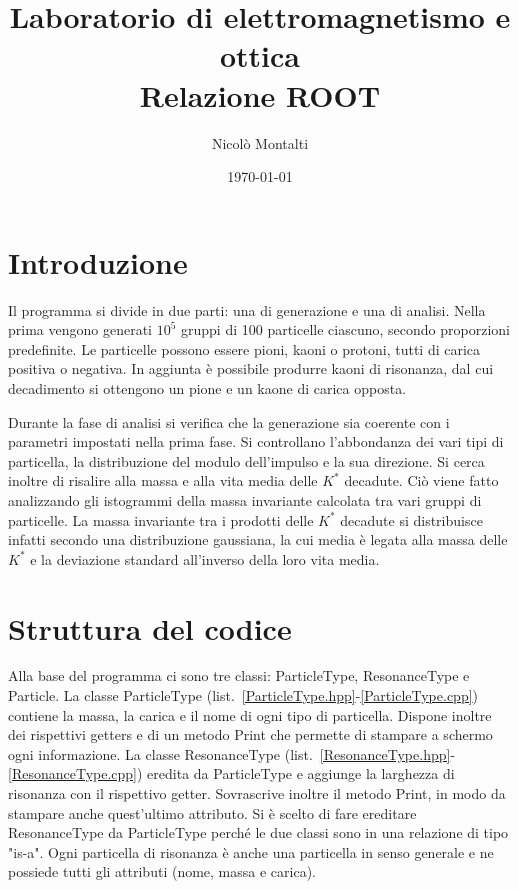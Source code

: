 \documentclass[a4paper,10pt]{article}
\title{Laboratorio di elettromagnetismo e ottica\\Relazione ROOT}
\author{Nicolò Montalti}
\date{\today}
\begin{document}
\maketitle
\section{Introduzione}
Il programma si divide in due parti: una di generazione e una di analisi. Nella prima vengono generati $10^5$ gruppi di 100 particelle ciascuno, secondo proporzioni predefinite. Le particelle possono essere pioni, kaoni o protoni, tutti di carica positiva o negativa. In aggiunta è possibile produrre kaoni di risonanza, dal cui decadimento si ottengono un pione e un kaone di carica opposta.

Durante la fase di analisi si verifica che la generazione sia coerente con i parametri impostati nella prima fase. Si controllano l'abbondanza dei vari tipi di particella, la distribuzione del modulo dell'impulso e la sua direzione. Si cerca inoltre di risalire alla massa e alla vita media delle $K^*$ decadute. Ciò viene fatto analizzando gli istogrammi della massa invariante calcolata tra vari gruppi di particelle. La massa invariante tra i prodotti delle $K^*$ decadute si distribuisce infatti secondo una distribuzione gaussiana, la cui media è legata alla massa delle $K^*$ e la deviazione standard all'inverso della loro vita media.

\section{Struttura del codice}
Alla base del programma ci sono tre classi: ParticleType, ResonanceType e Particle. La classe ParticleType (list.~\ref{ParticleType.hpp}-\ref{ParticleType.cpp}) contiene la massa, la carica e il nome di ogni tipo di particella. Dispone inoltre dei rispettivi getters e di un metodo Print che permette di stampare a schermo ogni informazione. La classe ResonanceType (list.~\ref{ResonanceType.hpp}-\ref{ResonanceType.cpp}) eredita da ParticleType e aggiunge la larghezza di risonanza con il rispettivo getter. Sovrascrive inoltre il metodo Print, in modo da stampare anche quest'ultimo attributo. Si è scelto di fare ereditare ResonanceType da ParticleType perché le due classi sono in una relazione di tipo "is-a". Ogni particella di risonanza è anche una particella in senso generale e ne possiede tutti gli attributi (nome, massa e carica).
\end{document}

